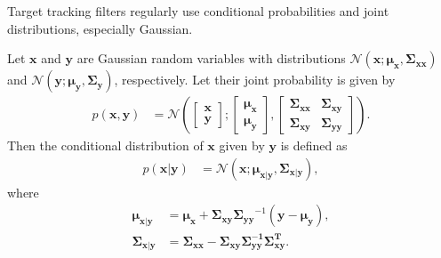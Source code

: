 Target tracking filters regularly use conditional probabilities and joint distributions, especially Gaussian. 
\begin{theorem}
Let $\mathbf{x}$ and $\mathbf{y}$ are Gaussian random variables with distributions $ \mathcal{N}(\mathbf{x};\mathbf{\mu_x},\mathbf{\Sigma_{xx}})$ and $ \mathcal{N}(\mathbf{y};\mathbf{\mu_y},\mathbf{\Sigma_{y}})$, respectively. Let their joint probability is given by
    \begin{align}
        p(\mathbf{x}, \mathbf{y}) &= \mathcal{N}\left(
        \begin{bmatrix}
           \mathbf{x}\\
           \mathbf{y}
        \end{bmatrix};
        \begin{bmatrix}
           \mathbf{\mu_x}\\
           \mathbf{\mu_y}
        \end{bmatrix},
        \begin{bmatrix}
           \mathbf{\Sigma_{xx}} & \mathbf{\Sigma_{xy}}\\
           \mathbf{\Sigma_{xy}} & \mathbf{\Sigma_{yy}}
        \end{bmatrix}
       \right).
    \end{align}
Then the conditional distribution of $\mathbf{x}$ given by $\mathbf{y}$ is defined as
    \begin{align}
         p(\mathbf{x}|\mathbf{y}) &= \mathcal{N}(\mathbf{x};\mathbf{\mu_{x|y}},\mathbf{\Sigma_{x|y}}),
    \end{align}
where 
    \begin{align}
        \mathbf{\mu_{x|y}} &= \mathbf{\mu_{x}} + \mathbf{\Sigma_{xy}} 
        \mathbf{\Sigma_{yy}}^{-1}(\mathbf{y} - \mathbf{\mu_{y}}),\\
        \mathbf{\Sigma_{x|y}} &= \mathbf{\Sigma_{xx}} - \mathbf{\Sigma_{xy}}
        \mathbf{\Sigma_{yy}^{-1}}\mathbf{\Sigma_{xy}^T}.
    \end{align}
\end{theorem}

